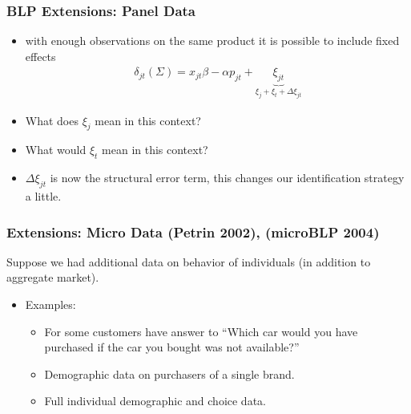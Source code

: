 \documentclass[xcolor=pdftex,dvipsnames,table,mathserif,aspectratio=169]{beamer}
\begin{document}
\begin{frame}
\frametitle{BLP Extensions: Panel Data}
\begin{itemize}
\item with enough observations on the same product it is possible to include fixed effects
\begin{eqnarray*}
\delta_{jt}(\Sigma) = x_{jt} \beta - \alpha p_{jt} + \underbrace{\xi_{jt}}_{\xi_{j} + \xi_t + \Delta \xi_{jt}}
\end{eqnarray*}
\item What does $\xi_{j}$ mean in this context?
\item What would $\xi_t$ mean in this context?
\item $\Delta \xi_{jt}$ is now the structural error term, this changes our identification strategy a little.
\end{itemize}
\end{frame}

\begin{frame}
\frametitle{Extensions: Micro Data (Petrin 2002), (microBLP 2004)}
Suppose we had additional data on behavior of individuals (in addition to aggregate market).
\begin{itemize}
\item Examples:
\begin{itemize}
\item For some customers have answer to ``Which car would you have purchased if the car you bought was not available?''
\item Demographic data on purchasers of a single brand.
\item Full individual demographic and choice data.
\end{itemize}
\end{itemize}
\end{frame}
\end{document}
